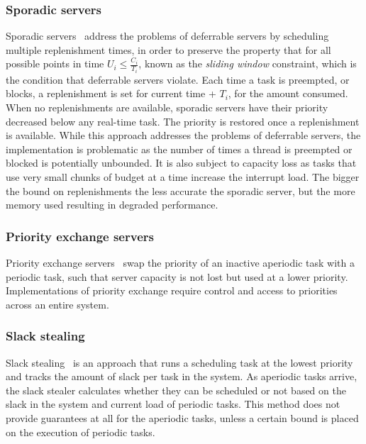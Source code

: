 \subsubsection{Sporadic servers}
\label{p:sporadic} 

Sporadic servers~\citep{Sprunt_SL_89a} address the problems of
deferrable servers by scheduling multiple replenishment times, in order to preserve the property
that for all possible points in time $U_{i} \leq \frac{C_{i}}{T_{i}}$, known as the \emph{sliding window} constraint, which
is the condition that deferrable servers violate.  Each time a task is preempted, or blocks, a
replenishment is set for current time + $T_{i}$, for the amount consumed.  When no replenishments are
available, sporadic servers have their priority decreased below any real-time task.  The priority is
restored once a replenishment is available.  While this approach addresses the problems of deferrable
servers, the implementation is problematic as the number of times a thread is preempted or blocked
is potentially unbounded.  It is also subject to capacity loss as tasks that use very small chunks
of budget at a time increase the interrupt load.  The bigger the bound on replenishments the less
accurate the sporadic server, but the more memory used resulting in degraded performance.

\subsubsection{Priority exchange servers}
Priority exchange servers~\citep{Sprunt_SL_89a} swap the priority of an inactive
aperiodic task with a periodic task, such that server capacity is not lost but used at a lower
priority.  Implementations of priority exchange require control and access to priorities across an
entire system.

\subsubsection{Slack stealing}

Slack stealing~\citep{Ramos_Thuel_Lehoczky_93} is an approach that runs a scheduling
task at the lowest priority and tracks the amount of slack per task in the system.  As aperiodic
tasks arrive, the slack stealer calculates whether they can be scheduled or not based on the slack
in the system and current load of periodic tasks.  This method does not provide guarantees at all
for the aperiodic tasks, unless a certain bound is placed on the execution of periodic tasks.

